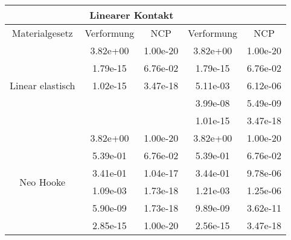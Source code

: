 \begin{table} 
\centering 
\begin{tabular}{c|cc|cc|} 
\cline{2-5} 
 & \multicolumn{2}{|c|}{Linearer Kontakt} &  \\ 
\hline 
\multicolumn{1}{|c|}{Materialgesetz} & \multicolumn{1}{c|}{Verformung} & \multicolumn{1}{c|}{NCP} & \multicolumn{1}{c|}{Verformung} & \multicolumn{1}{c|}{NCP} \\ 
\hline 
\multicolumn{1}{|c|}{\multirow{5}{*}{Linear elastisch}} &\multicolumn{1}{|c|}{  3.82e+00} & \multicolumn{1}{|c|}{  1.00e-20} & \multicolumn{1}{|c|}{  3.82e+00} & \multicolumn{1}{|c|}{  1.00e-20} \\ 
\multicolumn{1}{|c|}{} & \multicolumn{1}{|c|}{  1.79e-15} & \multicolumn{1}{|c|}{  6.76e-02} & \multicolumn{1}{|c|}{  1.79e-15} & \multicolumn{1}{|c|}{  6.76e-02} \\ 
\multicolumn{1}{|c|}{} & \multicolumn{1}{|c|}{  1.02e-15} & \multicolumn{1}{|c|}{  3.47e-18} & \multicolumn{1}{|c|}{  5.11e-03} & \multicolumn{1}{|c|}{  6.12e-06} \\ 
\multicolumn{1}{|c|}{} & \multicolumn{1}{|c|}{} & \multicolumn{1}{|c|}{} & \multicolumn{1}{|c|}{  3.99e-08} & \multicolumn{1}{|c|}{  5.49e-09} \\ 
\multicolumn{1}{|c|}{} & \multicolumn{1}{|c|}{} & \multicolumn{1}{|c|}{} & \multicolumn{1}{|c|}{  1.01e-15} & \multicolumn{1}{|c|}{  3.47e-18} \\ 
\hline 
\multicolumn{1}{|c|}{\multirow{6}{*}{Neo Hooke}} &\multicolumn{1}{|c|}{  3.82e+00} & \multicolumn{1}{|c|}{  1.00e-20} & \multicolumn{1}{|c|}{  3.82e+00} & \multicolumn{1}{|c|}{  1.00e-20} \\ 
\multicolumn{1}{|c|}{} & \multicolumn{1}{|c|}{  5.39e-01} & \multicolumn{1}{|c|}{  6.76e-02} & \multicolumn{1}{|c|}{  5.39e-01} & \multicolumn{1}{|c|}{  6.76e-02} \\ 
\multicolumn{1}{|c|}{} & \multicolumn{1}{|c|}{  3.41e-01} & \multicolumn{1}{|c|}{  1.04e-17} & \multicolumn{1}{|c|}{  3.44e-01} & \multicolumn{1}{|c|}{  9.78e-06} \\ 
\multicolumn{1}{|c|}{} & \multicolumn{1}{|c|}{  1.09e-03} & \multicolumn{1}{|c|}{  1.73e-18} & \multicolumn{1}{|c|}{  1.21e-03} & \multicolumn{1}{|c|}{  1.25e-06} \\ 
\multicolumn{1}{|c|}{} & \multicolumn{1}{|c|}{  5.90e-09} & \multicolumn{1}{|c|}{  1.73e-18} & \multicolumn{1}{|c|}{  9.89e-09} & \multicolumn{1}{|c|}{  3.62e-11} \\ 
\multicolumn{1}{|c|}{} & \multicolumn{1}{|c|}{  2.85e-15} & \multicolumn{1}{|c|}{  1.00e-20} & \multicolumn{1}{|c|}{  2.56e-15} & \multicolumn{1}{|c|}{  3.47e-18} \\ 

\end{tabular}
\end{table}
